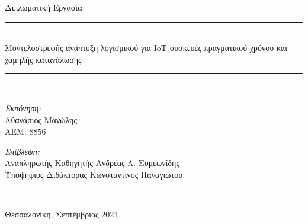 \begin{titlepage}
  \begin{center}
    \Large Διπλωματική Εργασία \\[0.8cm]

    \rule{450pt}{4pt} \\[0.4cm]
    {\fontsize{20.26pt}{1em}\selectfont Μοντελοστρεφής ανάπτυξη λογισμικού για IoT συσκευές πραγματικού χρόνου και χαμηλής κατανάλωσης}

    \rule{350pt}{4pt} \\[4cm]

    \begin{minipage}{0.4\textwidth}
      \begin{flushleft} \large
        \emph{Εκπόνηση:} \\
        Αθανάσιος Μανώλης\\
        ΑΕΜ: 8856
      \end{flushleft}
    \end{minipage}
    \begin{minipage}{0.45\textwidth}
      \begin{flushright} \large
        \emph{Επίβλεψη:} \\
        Αναπληρωτής Καθηγητής Ανδρέας Λ. Συμεωνίδης\\ 
        Υποψήφιος Διδάκτορας Κωνσταντίνος Παναγιώτου
      \end{flushright}
    \end{minipage}
    \\[1cm]
    \vfill

    \large Θεσσαλονίκη, Σεπτέμβριος 2021

  \end{center}
\end{titlepage}
